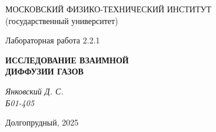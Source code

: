 \thispagestyle{empty}

\begin{center}
    МОСКОВСКИЙ ФИЗИКО-ТЕХНИЧЕСКИЙ ИНСТИТУТ \\
    (государственный университет)
\end{center}

\vfill

\begin{center}
    Лабораторная работа 2.2.1 \\ 
    \vspace{20pt}
    
    \textbf{ИССЛЕДОВАНИЕ ВЗАИМНОЙ} \\
    \textbf{ДИФФУЗИИ ГАЗОВ} \\
\end{center}  

\begin{center}
    \textit{Янковский Д. С.} \\
    \textit{Б01-405} \\
\end{center}  

\vfill

\begin{center}
    Долгопрудный, 2025
\end{center}